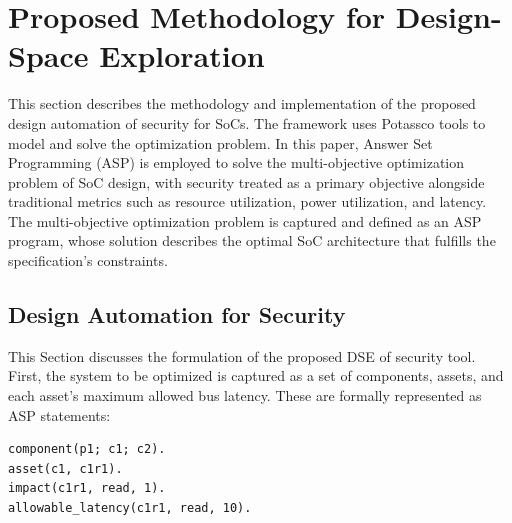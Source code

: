 \section{Proposed Methodology for Design-Space Exploration}
\label{sec:completedwork:ASP}
This section describes the methodology and implementation of the proposed design automation of security for SoCs. 
The framework uses Potassco tools to model and solve the optimization problem. 
In this paper, Answer Set Programming (ASP) is employed to solve the multi-objective optimization problem of SoC design, with security treated as a primary objective alongside traditional metrics such as resource utilization, power utilization, and latency.
The multi-objective optimization problem is captured and defined as an ASP program, whose solution describes the optimal SoC architecture that fulfills the specification's constraints. 



\subsection{Design Automation for Security}
This Section discusses the formulation of the proposed DSE of security tool. 
First, the system to be optimized is captured as a set of components, assets, and each asset's maximum allowed bus latency. These are formally represented as ASP statements:


\begin{verbatim}
component(p1; c1; c2).
asset(c1, c1r1).
impact(c1r1, read, 1).
allowable_latency(c1r1, read, 10).
\end{verbatim}

